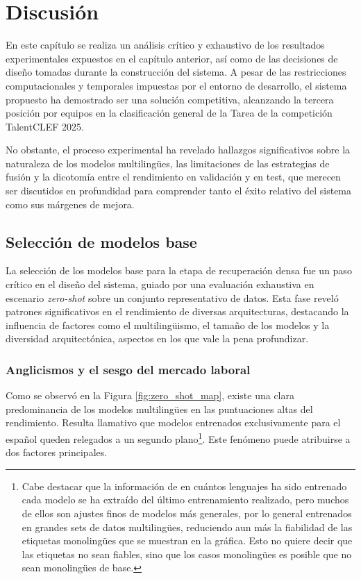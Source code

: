 
\chapter{Discusión}
\label{ch:Discusion}


\noindent En este capítulo se realiza un análisis crítico y exhaustivo de los resultados experimentales expuestos en el capítulo anterior, así como de las decisiones de diseño tomadas durante la construcción del sistema. A pesar de las restricciones computacionales y temporales impuestas por el entorno de desarrollo, el sistema propuesto ha demostrado ser una solución competitiva, alcanzando la tercera posición por equipos en la clasificación general de la \gls{Tarea} de la competición TalentCLEF 2025.

No obstante, el proceso experimental ha revelado hallazgos significativos sobre la naturaleza de los modelos multilingües, las limitaciones de las estrategias de fusión y la dicotomía entre el rendimiento en validación y en test, que merecen ser discutidos en profundidad para comprender tanto el éxito relativo del sistema como sus márgenes de mejora.

\section{Selección de modelos base}

\noindent La selección de los modelos base para la etapa de recuperación densa fue un paso crítico en el diseño del sistema, guiado por una evaluación exhaustiva en escenario \textit{zero-shot} sobre un conjunto representativo de datos. Esta fase reveló patrones significativos en el rendimiento de diversas arquitecturas, destacando la influencia de factores como el multilingüismo, el tamaño de los modelos y la diversidad arquitectónica, aspectos en los que vale la pena profundizar.

\subsection{Anglicismos y el sesgo del mercado laboral}
\noindent Como se observó en la Figura \ref{fig:zero_shot_map}, existe una clara predominancia de los modelos multilingües en las puntuaciones altas del rendimiento. Resulta llamativo que modelos entrenados exclusivamente para el español queden relegados a un segundo plano\footnote{Cabe destacar que la información de en cuántos lenguajes ha sido entrenado cada modelo se ha extraído del último entrenamiento realizado, pero muchos de ellos son ajustes finos de modelos más generales, por lo general entrenados en grandes sets de datos multilingües, reduciendo aun más la fiabilidad de las etiquetas monolingües que se muestran en la gráfica. Esto no quiere decir que las etiquetas no sean fiables, sino que los casos monolingües es posible que no sean monolingües de base.}. Este fenómeno puede atribuirse a dos factores principales. 

